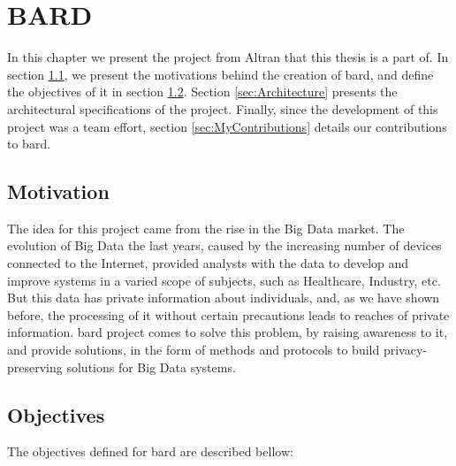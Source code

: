 %

\acresetall

\chapter{BARD}
\label{ch:BARD}


In this chapter we present the project from Altran that this thesis is a part of. 
In section \ref{sec:Motivation}, we present the motivations behind the creation of \ac{bard}, and define the objectives of it in section \ref{sec:Objectives}.
Section \ref{sec:Architecture} presents the architectural specifications of the project.
Finally, since the development of this project was a team effort, section \ref{sec:MyContributions} details our contributions to \ac{bard}.



\section{Motivation}
\label{sec:Motivation}

The idea for this project came from the rise in the Big Data market. The evolution of Big Data the last years, caused by the increasing number of devices connected to the Internet, provided analysts with the data to develop and improve systems in a varied scope of subjects, such as Healthcare, Industry, etc. But this data has private information about individuals, and, as we have shown before, the processing of it without certain precautions leads to reaches of private information. \ac{bard} project comes to solve this problem, by raising awareness to it, and provide solutions, in the form of methods and protocols to build privacy-preserving solutions for Big Data systems.

\section{Objectives}
\label{sec:Objectives}

The objectives defined for \ac{bard} are described bellow:

